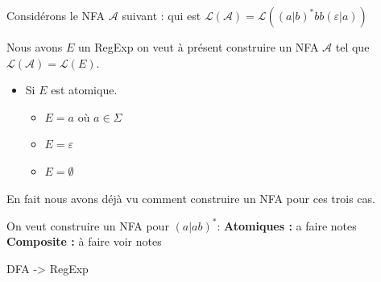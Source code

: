 \begin{exemple}
    Considérons le NFA $\mathcal{A}$ suivant : qui est $\mathcal{L}(\mathcal{A})= \mathcal{L}((a|b)^*bb(\varepsilon | a))$
\end{exemple}

Nous avons $E$ un RegExp on veut à présent construire un NFA $\mathcal{A}$ tel que $\mathcal{L}(\mathcal{A}) = \mathcal{L}(E)$. 
\begin{itemize}
    \item Si $E$ est atomique.
    \begin{itemize}
        \item $E= a$ où $a \in \Sigma$
        \item $E= \varepsilon$
        \item $E= \emptyset$
    \end{itemize}
\end{itemize}
En fait nous avons déjà vu comment construire un NFA pour ces trois cas.

On veut construire un NFA pour $(a|ab)^*$:
\textbf{Atomiques :}
a faire notes
\textbf{Composite :}
à faire voir notes 


DFA -> RegExp



